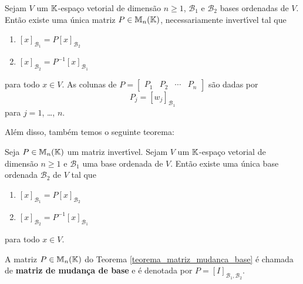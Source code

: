 \begin{teorema}\label{teorema_mudanca_base}
	Sejam $V$ um $\mathbb{K}$-espa\c{c}o vetorial de dimens\~ao $n \ge 1$, $\mathcal{B}_1$ e $\mathcal{B}_2$ bases ordenadas de $V$. Ent\~ao existe uma \'unica matriz $P \in \mathbb{M}_n(\mathbb{K})$, necessariamente invert{\'\i}vel tal que
	\begin{enumerate}[label={\roman*})]
		\item $[x]_{\mathcal{B}_1} = P[x]_{\mathcal{B}_2}$
		\item $[x]_{\mathcal{B}_2} = P^{-1}[x]_{\mathcal{B}_1}$
	\end{enumerate}
	para todo $x \in V$. As colunas de $P = \begin{bmatrix}
		P_1 & P_2 & \cdots & P_n
	\end{bmatrix}$ s\~ao dadas por
	\[
		P_j = [w_j]_{\mathcal{B}_1}
	\]
	para $j = 1$, \dots, $n$.
\end{teorema}

Al\'em disso, tamb\'em temos o seguinte teorema:

\begin{teorema}\label{teorema_matriz_mudanca_base}
	Seja $P \in \mathbb{M}_n(\mathbb{K})$ um matriz invert{\'\i}vel. Sejam $V$ um $\mathbb{K}$-espa\c{c}o vetorial de dimens\~ao $n \ge 1$ e $\mathcal{B}_1$ uma base ordenada de $V$. Ent\~ao existe uma \'unica base ordenada $\mathcal{B}_2$ de $V$ tal que
	\begin{enumerate}[label={\roman*})]
		\item $[x]_{\mathcal{B}_1} = P[x]_{\mathcal{B}_2}$
		\item $[x]_{\mathcal{B}_2} = P^{-1}[x]_{\mathcal{B}_1}$
	\end{enumerate}
	para todo $x \in V$.
\end{teorema}

\begin{definicao}
	A matriz $P \in \mathbb{M}_n(\mathbb{K})$ do Teorema \ref{teorema_matriz_mudanca_base} \'e chamada de \textbf{matriz de mudan\c{c}a de base} e \'e denotada por $P = [I]_{{\mathcal{B}_1},{\mathcal{B}_2}}$.
\end{definicao}

